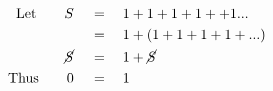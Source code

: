 \begin{align*}
\mathrm{Let}\qquad S\quad&\,=\quad1+1+1+1++1...\\
\,&\,=\quad1+(1+1+1+1+...)\\
\cancel{S}\quad&\,=\quad1+\cancel{S}\\
\mathrm{Thus}\qquad0\quad&\,=\quad1
\end{align*}
